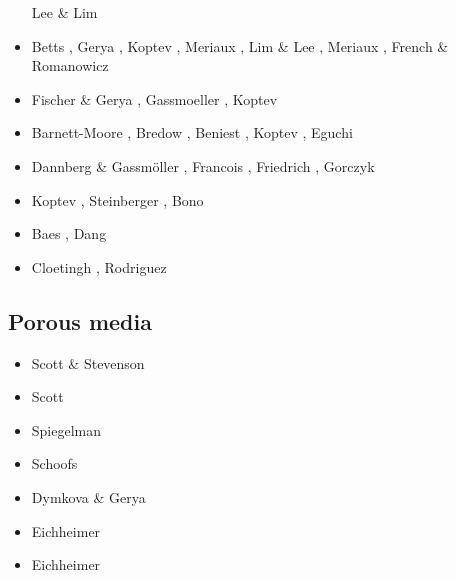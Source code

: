 \begin{scriptsize}
\begin{itemize}
                            Lee \& Lim \cite{leli14}
\item[\twothousandfifteen] Betts \etal \cite{bemm15}, Gerya \etal \cite{gesb15},
                           Koptev \etal \cite{kocb15}, Meriaux \etal \cite{meds15},
                           Lim \& Lee \cite{lile15}, Meriaux \etal \cite{medd15},
                           French \& Romanowicz \cite{frro15}
\item[\twothousandsixteen] Fischer \& Gerya \cite{fige16}, Gassmoeller \etal \cite{gadb16},
                           Koptev \etal \cite{kobc16}
\item[\twothousandseventeen] Barnett-Moore \etal \cite{bahf17}, Bredow \etal \cite{brsg17},
                             Beniest \etal \cite{bekb17}, Koptev \etal \cite{kocb17},
                             Eguchi \etal \cite{egim17}
\item[\twothousandeighteen] Dannberg \& Gassm\"oller \cite{daga18}, Francois \etal \cite{frkc18},
                            Friedrich \etal \cite{frbr18}, Gorczyk \etal \cite{gomb18}
\item[\twothousandnineteen] Koptev \etal \cite{kobg19}, Steinberger \etal \cite{stbl19},
                            Bono \etal \cite{botb19}
\item[\twothousandtwenty] Baes \etal \cite{basg20,basg20b}, Dang \etal \cite{dazl20}
\item[\twothousandtwentyone] Cloetingh \etal \cite{clkk21}, Rodriguez \etal \cite{roac21}
\end{itemize}
\end{scriptsize}

\subsection{Porous media} 

\begin{scriptsize}
\begin{itemize}
\item[\nineteeneightysix] Scott \& Stevenson \cite{scst86}
\item[\nineteeneightyeight] Scott \cite{scot88}
\item[\nineteenninetythree] Spiegelman \cite{spie93}
\item[\twothousand] Schoofs \etal \cite{scth00b}
\item[\twothousandthirteen] Dymkova \& Gerya \cite{dyge13}
\item[\twothousandnineteen] Eichheimer \etal \cite{eitp19}
\item[\twothousandtwenty] Eichheimer \etal \cite{eitf20}
\end{itemize}
\end{scriptsize}

